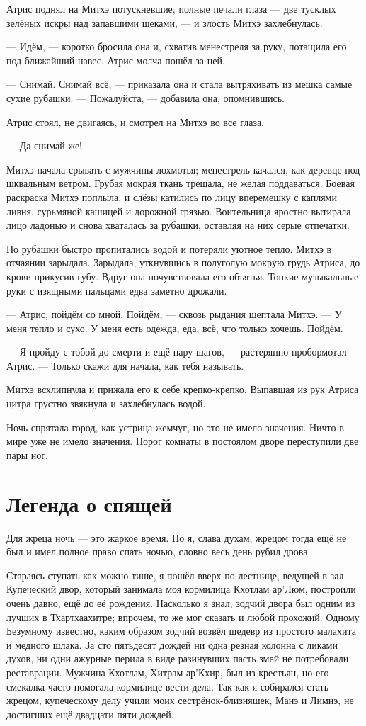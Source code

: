Атрис поднял на Митхэ потускневшие, полные печали глаза --- две тусклых зелёных искры над запавшими щеками, --- и злость Митхэ захлебнулась.

--- Идём, --- коротко бросила она и, схватив менестреля за руку, потащила его под ближайший навес.
Атрис молча пошёл за ней.

--- Снимай. Снимай всё, --- приказала она и стала вытряхивать из мешка самые сухие рубашки.
--- Пожалуйста, --- добавила она, опомнившись.

Атрис стоял, не двигаясь, и смотрел на Митхэ во все глаза.

--- Да снимай же!

Митхэ начала срывать с мужчины лохмотья;
менестрель качался, как деревце под шквальным ветром.
Грубая мокрая ткань трещала, не желая поддаваться.
Боевая раскраска Митхэ поплыла, и слёзы катились по лицу вперемешку с каплями ливня, сурьмяной кашицей и дорожной грязью.
Воительница яростно вытирала лицо ладонью и снова хваталась за рубашки, оставляя на них серые отпечатки.

Но рубашки быстро пропитались водой и потеряли уютное тепло.
Митхэ в отчаянии зарыдала.
Зарыдала, уткнувшись в полуголую мокрую грудь Атриса, до крови прикусив губу.
Вдруг она почувствовала его объятья.
Тонкие музыкальные руки с изящными пальцами едва заметно дрожали.

--- Атрис, пойдём со мной. Пойдём, --- сквозь рыдания шептала Митхэ.
--- У меня тепло и сухо.
У меня есть одежда, еда, всё, что только хочешь.
Пойдём.

--- Я пройду с тобой до смерти и ещё пару шагов, --- растерянно пробормотал Атрис.
--- Только скажи для начала, как тебя называть.

Митхэ всхлипнула и прижала его к себе крепко-крепко.
Выпавшая из рук Атриса цитра грустно звякнула и захлебнулась водой.

Ночь спрятала город, как устрица жемчуг, но это не имело значения.
Ничто в мире уже не имело значения.
Порог комнаты в постоялом дворе переступили две пары ног.

\section{Легенда о спящей}

Для жреца ночь --- это жаркое время.
Но я, слава духам, жрецом тогда ещё не был и имел полное право спать ночью, словно весь день рубил дрова.

Стараясь ступать как можно тише, я пошёл вверх по лестнице, ведущей в зал.
Купеческий двор, который занимала моя кормилица Кхотлам ар’Люм, построили очень давно, ещё до её рождения.
Насколько я знал, зодчий двора был одним из лучших в Тхартхаахитре;
впрочем, то же мог сказать и любой прохожий.
Одному Безумному известно, каким образом зодчий возвёл шедевр из простого малахита и медного шлака.
За сто пятьдесят дождей ни одна резная колонна с ликами духов, ни одни ажурные перила в виде разинувших пасть змей не потребовали реставрации.
Мужчина Кхотлам, Хитрам ар’Кхир, был из крестьян, но его смекалка часто помогала кормилице вести дела.
Так как я собирался стать жрецом, купеческому делу учили моих сестрёнок-близняшек, Манэ и Лимнэ, не достигших ещё двадцати пяти дождей.

